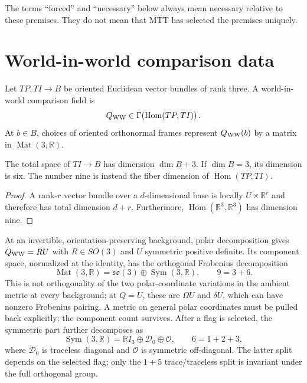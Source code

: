 \documentclass[11pt]{article}
\begin{document}
The terms ``forced'' and ``necessary'' below always mean necessary relative to
these premises.  They do not mean that MTT has selected the premises uniquely.

\section{World-in-world comparison data}

\begin{definition}
Let $TP,TI\to B$ be oriented Euclidean vector bundles of rank three.  A
world-in-world comparison field is
\[
 Q_{\rm WW}\in\Gamma\!\left(\operatorname{Hom}(TP,TI)\right).
\]
At $b\in B$, choices of oriented orthonormal frames represent
$Q_{\rm WW}(b)$ by a matrix in $\operatorname{Mat}(3,\mathbb R)$.
\end{definition}

\begin{proposition}
The total space of $TI\to B$ has dimension $\dim B+3$.  If $\dim B=3$, its
dimension is six.  The number nine is instead the fiber dimension of
$\operatorname{Hom}(TP,TI)$.
\end{proposition}

\begin{proof}
A rank-$r$ vector bundle over a $d$-dimensional base is locally
$U\times\mathbb R^r$ and therefore has total dimension $d+r$.
Furthermore, $\operatorname{Hom}(\mathbb R^3,\mathbb R^3)$ has dimension nine.
\end{proof}

At an invertible, orientation-preserving background, polar decomposition gives
$Q_{\rm WW}=RU$ with $R\in SO(3)$ and $U$ symmetric positive definite.  Its
component space, normalized at the identity, has the orthogonal Frobenius decomposition
\[
 \operatorname{Mat}(3,\mathbb R)
 =\mathfrak{so}(3)\oplus\operatorname{Sym}(3,\mathbb R),
 \qquad 9=3+6.
\]
This is not orthogonality of the two polar-coordinate variations in the
ambient metric at every background: at $Q=U$, these are $\Omega U$ and
$\delta U$, which can have nonzero Frobenius pairing. A metric on general
polar coordinates must be pulled back explicitly; the component count survives.
After a flag is selected, the symmetric part further decomposes as
\[
 \operatorname{Sym}(3,\mathbb R)
 =\mathbb RI_3\oplus\mathcal D_0\oplus\mathcal O,
 \qquad 6=1+2+3,
\]
where $\mathcal D_0$ is traceless diagonal and $\mathcal O$ is symmetric
off-diagonal.  The latter split depends on the selected flag; only the
$1+5$ trace/traceless split is invariant under the full orthogonal group.
\end{document}
